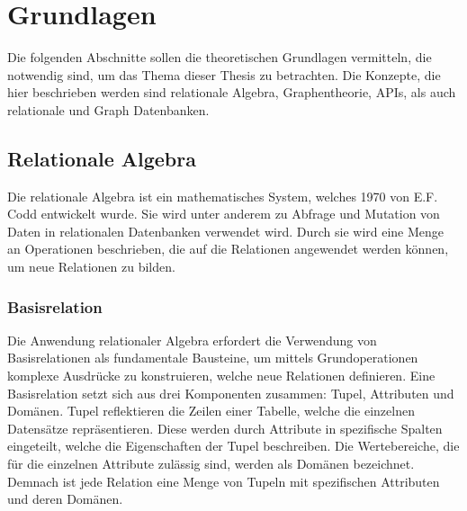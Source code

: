 \chapter{Grundlagen} %
\label{sec:grundlagen}
Die folgenden Abschnitte sollen die theoretischen Grundlagen vermitteln, die notwendig sind, um das Thema dieser Thesis zu betrachten. Die Konzepte, die hier beschrieben werden sind relationale Algebra, Graphentheorie, APIs, als auch relationale und Graph Datenbanken.
\section{Relationale Algebra} %
\label{sec:relationaleAlgebra}
Die relationale Algebra ist ein mathematisches System, welches 1970 von E.F. Codd entwickelt wurde. Sie wird unter anderem zu Abfrage und Mutation von Daten in relationalen Datenbanken verwendet wird. Durch sie wird eine Menge an Operationen beschrieben, die auf die Relationen angewendet werden können, um neue Relationen zu bilden. \citep{rdb}

\subsection{Basisrelation} %
\label{sec:basisrelation}
Die Anwendung relationaler Algebra erfordert die Verwendung von Basisrelationen als fundamentale Bausteine, um mittels Grundoperationen komplexe Ausdrücke zu konstruieren, welche neue Relationen definieren. Eine Basisrelation setzt sich aus drei Komponenten zusammen: Tupel, Attributen und Domänen. Tupel reflektieren die Zeilen einer Tabelle, welche die einzelnen Datensätze repräsentieren. Diese werden durch Attribute in spezifische Spalten eingeteilt, welche die Eigenschaften der Tupel beschreiben. Die Wertebereiche, die für die einzelnen Attribute zulässig sind, werden als Domänen bezeichnet. Demnach ist jede Relation eine Menge von Tupeln mit spezifischen Attributen und deren Domänen. \citep{rdb}

